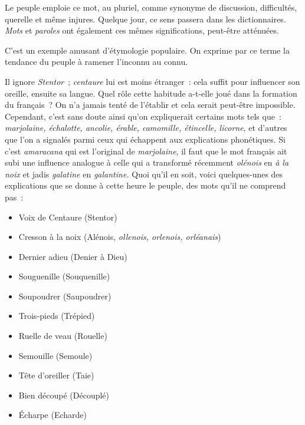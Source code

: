 \documentclass[french,twoside]{book} %
\def\mednobreak{\ifdim\lastskip<\medskipamount
  \removelastskip\nopagebreak\medskip\fi}
\newcommand{\labelblock}[1]{\medbreak{\noindent\color{rubric}\bfseries #1}\par\mednobreak}
\begin{document}
\labelblock{{\itshape Raisons.}}

\noindent Le peuple emploie ce mot, au pluriel, comme synonyme de discussion, difficultés, querelle et même injures. Quelque jour, ce sens passera dans les dictionnaires. {\itshape Mots} et {\itshape paroles} ont également ces mêmes significations, peut-être atténuées.\par

\labelblock{{\itshape Voix de Centaure.}}

\noindent C’est un exemple amusant d’étymologie populaire. On exprime par ce terme la tendance du peuple à ramener l’inconnu au connu.\par
Il ignore {\itshape Stentor} ; {\itshape centaure} lui est moins étranger : cela suffit pour influencer son oreille, ensuite sa langue. Quel rôle cette habitude a-t-elle joué dans la formation du français ? On n’a jamais tenté de l’établir et cela serait peut-être impossible. Cependant, c’est sans doute ainsi qu’on expliquerait certains mots tels que : {\itshape marjolaine, échalotte, ancolie, érable, camomille, étincelle, licorne}, et d’autres que l’on a signalés parmi ceux qui échappent aux explications phonétiques. Si c’est {\itshape amaracana} qui est l’original de {\itshape marjolaine}, il faut que le mot français ait subi une influence analogue à celle qui a transformé récemment {\itshape olénois} en {\itshape à la noix} et jadis {\itshape galatine} en {\itshape galantine.} Quoi qu’il en soit, voici quelques-unes des explications que se donne à cette heure le peuple, des mots qu’il ne comprend pas :\par

\begin{itemize}[itemsep=0pt,]
\item Voix de Centaure (Stentor)
\item Cresson à la noix (Alénois, {\itshape ollenois, orlenois, orléanais})
\item Dernier adieu (Denier à Dieu)
\item Souguenille (Souquenille)
\item Soupoudrer (Saupoudrer)
\item Trois-pieds (Trépied)
\item Ruelle de veau (Rouelle)
\item Semouille (Semoule)
\item Tête d’oreiller (Taie)
\item Bien découpé (Découplé)
\item Écharpe (Echarde)
\end{itemize}
\end{document}
